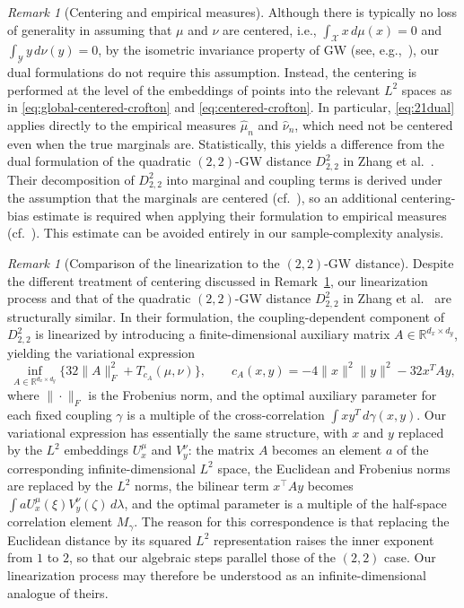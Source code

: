 \documentclass[11pt]{amsart}
\theoremstyle{definition}
\theoremstyle{remark}
\newtheorem{remark}[theorem]{Remark}
\newcommand{\R}{\mathbb{R}}
\newcommand{\1}{\mathbf{1}}
\numberwithin{equation}{section}
\begin{document}
\begin{remark}[Centering and empirical measures]
\label{rem:centering}
Although there is typically no loss of generality in assuming that $\mu$ and $\nu$ are centered, i.e.,
$\int_{\mathcal X}x\,d\mu(x)=0$ and
$\int_{\mathcal Y}y\,d\nu(y)=0$, by the isometric
invariance property of GW (see, e.g.,~\cite[Theorem~5.1(a)]{memoli2011gromov}), our dual formulations do not require this
assumption. Instead, the centering is performed at the level of the
embeddings of points into the relevant $L^2$ spaces as in
\eqref{eq:global-centered-crofton} and
\eqref{eq:centered-crofton}. In particular, \eqref{eq:21dual} applies
directly to the empirical measures $\widehat\mu_n$ and
$\widehat\nu_n$, which need not be centered even when the true
marginals are. Statistically, this yields a difference from the dual
formulation of the quadratic $(2,2)$-GW distance $D^{2}_{2,2}$ in
Zhang et al.~\cite{zhang2024gromov}. Their decomposition of
$D^{2}_{2,2}$ into marginal and coupling terms is derived under the
assumption that the marginals are centered
(cf.~\cite[Section~5.1]{zhang2024gromov}), so an additional centering-bias
estimate is required when applying their formulation to empirical
measures
(cf.~\cite[Section~5.3.1]{zhang2024gromov}).
This estimate can be avoided entirely in our sample-complexity
analysis.
\end{remark}

\begin{remark}[Comparison of the linearization to the $(2,2)$-GW distance]
\label{rem:comparison-22}
Despite the different treatment of centering discussed in
Remark~\ref{rem:centering}, our linearization process and that of the
quadratic $(2,2)$-GW distance $D^{2}_{2,2}$ in Zhang et
al.~\cite{zhang2024gromov} are structurally similar. In their
formulation, the coupling-dependent component of $D^2_{2,2}$ is
linearized by introducing a finite-dimensional auxiliary matrix
$A\in\R^{d_x\times d_y}$, yielding the variational expression
$$
\inf_{A\in\R^{d_x\times d_y}}
\bigl\{32\|A\|_F^2+T_{c_A}(\mu,\nu)\bigr\},
\qquad
c_A(x,y)
=
-4\|x\|^2\|y\|^2-32 x^T Ay,
$$
where $\|\cdot\|_F$ is the Frobenius norm, and the optimal auxiliary
parameter for each fixed coupling $\gamma$ is a multiple of the
cross-correlation $\int xy^T\,d\gamma(x,y)$. Our variational
expression has essentially the same structure, with $x$ and $y$
replaced by the $L^2$ embeddings $U_x^\mu$ and $V_y^\nu$: the matrix
$A$ becomes an element $a$ of the corresponding infinite-dimensional
$L^2$ space, the Euclidean and Frobenius norms are replaced by the
$L^2$ norms, the bilinear term $x^\top Ay$ becomes
$\int aU_x^\mu(\xi)V_y^\nu(\zeta)\,d\lambda$, and the optimal
parameter is a multiple of the half-space correlation element
$M_\gamma$. The reason for this correspondence is that replacing the
Euclidean distance by its squared $L^2$ representation raises the
inner exponent from $1$ to $2$, so that our algebraic steps parallel
those of the $(2,2)$ case. Our linearization process may therefore be
understood as an infinite-dimensional analogue of theirs.
\end{remark}
\end{document}
